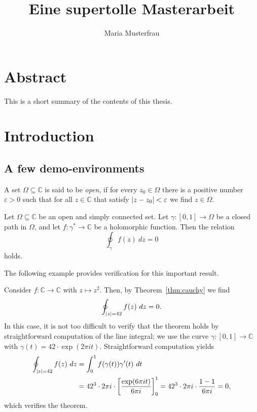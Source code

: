 \documentclass[11pt, twoside, withdegree]{bhthesis}
\title{Eine supertolle Masterarbeit}
\author{Maria Musterfrau}
\DeclarePairedDelimiter{\abs}{\lvert}{\rvert}
\begin{document}
\maketitle

\chapter*{Abstract}
This is a short summary of the contents of this thesis.

\tableofcontents

\chapter{Introduction}\label{chap:intro}

\section{A few demo-environments}

\begin{definition}
  A set $\Omega\subseteq\mathbb{C}$ is said to be \emph{open}, if for every
  $z_{0}\in\Omega$ there is a positive number $\varepsilon > 0$ such
  that for all $z\in\mathbb{C}$ that satisfy $\abs{z - z_{0}} <
  \varepsilon$ we find $z\in\Omega$.
\end{definition}

\begin{theorem}\label{thm:cauchy}
  Let $\Omega\subseteq\mathbb{C}$ be an open and simply connected
  set. Let $\gamma:[0,1]\to \Omega$ be a closed path in $\Omega$, and
  let $f\colon\gamma^{*} \to \mathbb{C}$ be a holomorphic function.
  Then the relation
  \begin{equation}\label{eq:cauchy-integral}
    \oint_{\gamma} f(z)~dz = 0
  \end{equation}
  holds.
\end{theorem}

The following example provides verification for this important result.

\begin{example}
  Consider $f\colon \mathbb{C} \to \mathbb{C}$ with $z\mapsto
  z^{2}$. Then, by Theorem~\ref{thm:cauchy} we find
  \[ \oint_{\abs{z} = 42} f(z)~dz = 0.  \]
  In this case, it is not too difficult to verify that the theorem
  holds by straightforward computation of the line integral; we use
  the curve $\gamma\colon [0,1]\to \mathbb{C}$ with $\gamma(t) =
  42\cdot\exp(2\pi i t)$. Straightforward computation yields
  \begin{align*}
    \oint_{\abs{z} = 42} f(z)~dz
    &= \int_{0}^{1} f(\gamma(t)) \gamma'(t)~dt\\
    &= 42^{3}\cdot 2\pi i \cdot \biggl[\frac{\exp(6 \pi i t)}{6 \pi
      i}\biggr]_{0}^{1} = 42^{3}\cdot 2\pi i\cdot \frac{1 - 1}{6\pi
      i} = 0,
  \end{align*}
  which verifies the theorem.
\end{example}
\end{document}
